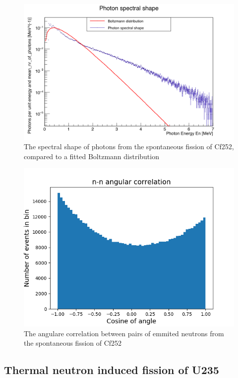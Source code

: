 \documentclass[]{article}
\begin{document}
\begin{figure} [H]
	\centering
	\includegraphics[scale=0.36]{Cf252_sf_photons_spectral_shape.png}
	\caption{The spectral shape of photons from the spontaneous fission of Cf252, compared to a fitted Boltzmann distribution}
	\label{fig:Cf252_sf_photons_spectral_shape}
\end{figure}
	
\begin{figure} [H]
	\centering
	\includegraphics[scale=0.7]{Cf252_sf_n_n_ang_corr.png}
	\caption{The angulare correlation between pairs of emmited neutrons from the spontaneous fission of Cf252}
	\label{fig:Cf252_sf_n_n_ang_corr}
\end{figure}
	
\subsection{Thermal neutron induced fission of U235}
\end{document}
